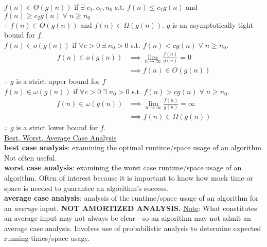 \documentclass[12pt, fleqn]{general}
\begin{document}
\begin{multicols*}{2}
    $f(n) \in \Theta(g(n))$ if $\exists\; c_1, c_2, n_0$ s.t. $f(n) \leq c_1 g(n)$ and $f(n) \geq c_2 g(n)\;\forall\; n \geq n_0$\\
    $\therefore$ $f(n) \in O(g(n))$ and $f(n) \in \Omega(g(n))$. $g$ is an asymptotically tight bound for $f$.\\

    $f(n) \in o(g(n))$ if $\forall c > 0\; \exists\; n_0 > 0$ s.t. $f(n) < c g(n)\; \forall\; n \geq n_0$. \vspace{-5pt}
    \begin{align*}
        f(n) \in o(g(n)) &\implies \lim_{n\rightarrow\infty} \frac{f(n)}{g(n)} = 0\\
                         &\implies f(n) \in O(g(n))
    \end{align*}
    $\therefore$ $g$ is a strict upper bound for $f$\\

    $f(n) \in \omega(g(n))$ if $\forall c > 0\; \exists\; n_0 > 0$ s.t. $f(n) > c g(n)\; \forall\; n \geq n_0$.\vspace{-5pt}
    \begin{align*}
        f(n) \in \omega(g(n)) &\implies \lim_{n\rightarrow\infty} \frac{f(n)}{g(n)} = \infty\\
                            &\implies f(n) \in \Omega(g(n))
    \end{align*}
    $\therefore$ $g$ is a strict lower bound for $f$.\\


    {\large \underline{Best, Worst, Average Case Analysis}}\\

    \textbf{best case analysis}: examining the optimal runtime/space usage of an algorithm. Not often useful.\\

    \textbf{worst case analysis}: examining the worst case runtime/space usage of an algorithm. Often of interest because it is important to know how much time or space is needed to guarantee an algorithm's success.\\

    \textbf{average case analysis}: analysis of the runtime/space usage of an algorithm for an \emph{average} input. \textbf{NOT AMORTIZED ANALYSIS.} \underline{Note}: What constitutes an average input may not always be clear - so an algorithm may not admit an average case analysis. Involves use of probabilistic analysis to determine expected running times/space usage.\\


\end{multicols*}
\end{document}
